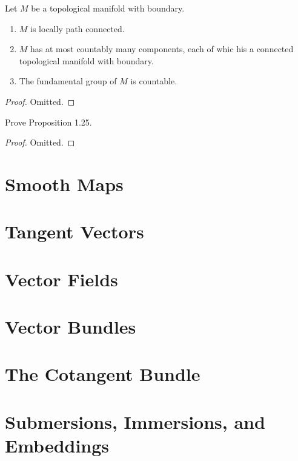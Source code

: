 \begin{proposition}
\label{proposition-1-25}

Let $M$ be a topological manifold with boundary.

\begin{enumerate}
\item $M$ is locally path connected.
\item $M$ has at most countably many components, each of whic his a connected
topological manifold with boundary.
\item The fundamental group of $M$ is countable.
\end{enumerate}

\end{proposition}

\begin{proof}
Omitted.
\end{proof}

\begin{exercise}
\label{exercise-1-6}

Prove Proposition 1.25.

\end{exercise}

\begin{proof}
Omitted.
\end{proof}


\section{Smooth Maps}
\label{section-smooth-maps}

\section{Tangent Vectors}
\label{section-tangent-vectors}

\section{Vector Fields}
\label{section-vector-fields}

\section{Vector Bundles}
\label{section-vector-bundles}

\section{The Cotangent Bundle}
\label{section-cotangent-bundle}

\section{Submersions, Immersions, and Embeddings}
\label{section-submersions-immersions-embeddings}







